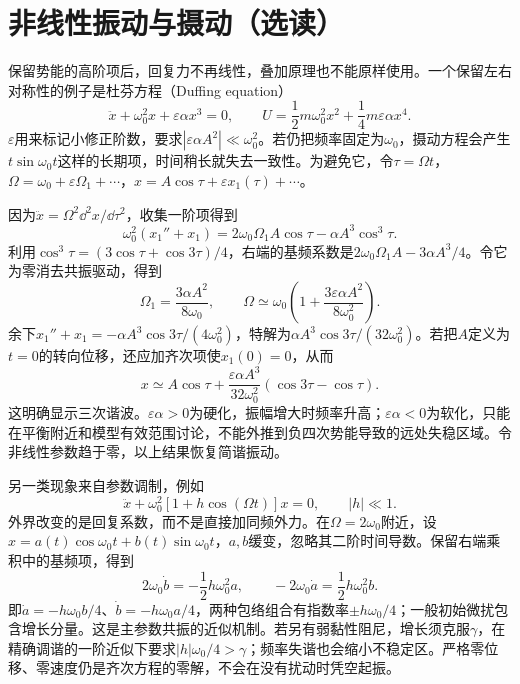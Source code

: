 \section{非线性振动与摄动（选读）}\label{ch10:sec:nonlinear}
保留势能的高阶项后，回复力不再线性，叠加原理也不能原样使用。一个保留左右对称性的例子是杜芬方程（Duffing equation）
\[
 \ddot x+\omega_0^2x+\varepsilon\alpha x^3=0,
 \qquad U=\frac12m\omega_0^2x^2+\frac14m\varepsilon\alpha x^4.
\]
$\varepsilon$用来标记小修正阶数，要求$|\varepsilon\alpha A^2|\ll\omega_0^2$。若仍把频率固定为$\omega_0$，摄动方程会产生$t\sin\omega_0t$这样的长期项，时间稍长就失去一致性。为避免它，令$\tau=\Omega t$，$\Omega=\omega_0+\varepsilon\Omega_1+\cdots$，$x=A\cos\tau+\varepsilon x_1(\tau)+\cdots$。

因为$\ddot x=\Omega^2\dd^2x/\dd\tau^2$，收集一阶项得到
\[
 \omega_0^2(x_1''+x_1)=2\omega_0\Omega_1 A\cos\tau-\alpha A^3\cos^3\tau.
\]
利用$\cos^3\tau=(3\cos\tau+\cos3\tau)/4$，右端的基频系数是$2\omega_0\Omega_1A-3\alpha A^3/4$。令它为零消去共振驱动，得到
\[
 \Omega_1=\frac{3\alpha A^2}{8\omega_0},\qquad
 \boxed{\Omega\simeq\omega_0\left(1+\frac{3\varepsilon\alpha A^2}{8\omega_0^2}\right)}.
\]
余下$x_1''+x_1=-\alpha A^3\cos3\tau/(4\omega_0^2)$，特解为$\alpha A^3\cos3\tau/(32\omega_0^2)$。若把$A$定义为$t=0$的转向位移，还应加齐次项使$x_1(0)=0$，从而
\[
 x\simeq A\cos\tau+
 \frac{\varepsilon\alpha A^3}{32\omega_0^2}(\cos3\tau-\cos\tau).
\]
这明确显示三次谐波。$\varepsilon\alpha>0$为硬化，振幅增大时频率升高；$\varepsilon\alpha<0$为软化，只能在平衡附近和模型有效范围讨论，不能外推到负四次势能导致的远处失稳区域。令非线性参数趋于零，以上结果恢复简谐振动。

另一类现象来自参数调制，例如
\[
 \ddot x+\omega_0^2[1+h\cos(\Omega t)]x=0,\qquad |h|\ll1.
\]
外界改变的是回复系数，而不是直接加同频外力。在$\Omega=2\omega_0$附近，设$x=a(t)\cos\omega_0t+b(t)\sin\omega_0t$，$a,b$缓变，忽略其二阶时间导数。保留右端乘积中的基频项，得到
\[
 2\omega_0\dot b=-\frac12h\omega_0^2a,
 \qquad -2\omega_0\dot a=\frac12h\omega_0^2b.
\]
即$\dot a=-h\omega_0b/4$、$\dot b=-h\omega_0a/4$，两种包络组合有指数率$\pm h\omega_0/4$；一般初始微扰包含增长分量。这是主参数共振的近似机制。若另有弱黏性阻尼，增长须克服$\gamma$，在精确调谐的一阶近似下要求$|h|\omega_0/4>\gamma$；频率失谐也会缩小不稳定区。严格零位移、零速度仍是齐次方程的零解，不会在没有扰动时凭空起振。

